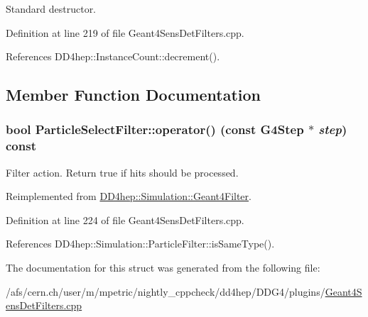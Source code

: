 Standard destructor. 

Definition at line 219 of file Geant4SensDetFilters.cpp.

References DD4hep::InstanceCount::decrement().

\subsection{Member Function Documentation}
\hypertarget{struct_d_d4hep_1_1_simulation_1_1_particle_select_filter_a4d0d7fb1f0c8f552f5d8940405a3bbe2}{
\subsubsection[{operator()}]{\setlength{\rightskip}{0pt plus 5cm}bool ParticleSelectFilter::operator() (const G4Step $\ast$ {\em step}) const}}
\label{struct_d_d4hep_1_1_simulation_1_1_particle_select_filter_a4d0d7fb1f0c8f552f5d8940405a3bbe2}


Filter action. Return true if hits should be processed. 

Reimplemented from \hyperlink{class_d_d4hep_1_1_simulation_1_1_geant4_filter_afff6fafea1b7c0c7d61834ae0a51a23f}{DD4hep::Simulation::Geant4Filter}.

Definition at line 224 of file Geant4SensDetFilters.cpp.

References DD4hep::Simulation::ParticleFilter::isSameType().

The documentation for this struct was generated from the following file:\begin{DoxyCompactItemize}
\item 
/afs/cern.ch/user/m/mpetric/nightly\_\-cppcheck/dd4hep/DDG4/plugins/\hyperlink{_geant4_sens_det_filters_8cpp}{Geant4SensDetFilters.cpp}\end{DoxyCompactItemize}
